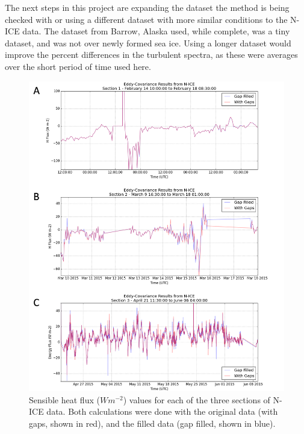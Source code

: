 The next steps in this project are expanding the dataset the method is being checked with or using a different dataset with more similar conditions to the N-ICE data. The dataset from Barrow, Alaska used, while complete, was a tiny dataset, and was not over newly formed sea ice. Using a longer dataset would improve the percent differences in the turbulent spectra, as these were averages over the short period of time used here. 

  \begin{figure}[h]
    \centering
    \includegraphics[width=1\linewidth]{figures/appendixb/nice_fluxes.png}
    \caption[N-ICE sensible heat flux]{Sensible heat flux ($Wm^{-2}$) values for each of the three sections of N-ICE data. Both calculations were done with the original data (with gaps, shown in red), and the filled data (gap filled, shown in blue).}
    \label{fig:nice_fluxes}
\end{figure}

